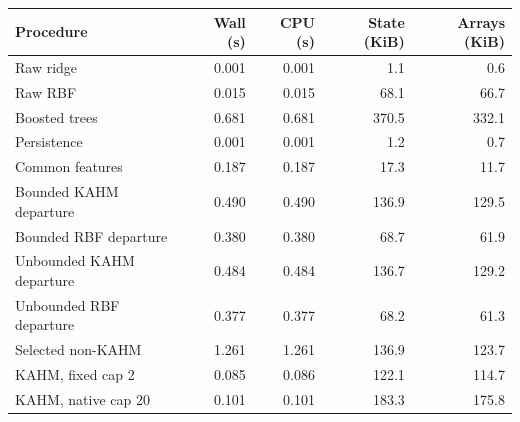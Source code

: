 \begin{tabular}{@{}lrrrr@{}}
\toprule
Procedure & Wall (s) & CPU (s) & State (KiB) & Arrays (KiB) \\
\midrule
Raw ridge & 0.001 & 0.001 & 1.1 & 0.6 \\
Raw RBF & 0.015 & 0.015 & 68.1 & 66.7 \\
Boosted trees & 0.681 & 0.681 & 370.5 & 332.1 \\
Persistence & 0.001 & 0.001 & 1.2 & 0.7 \\
Common features & 0.187 & 0.187 & 17.3 & 11.7 \\
Bounded KAHM departure & 0.490 & 0.490 & 136.9 & 129.5 \\
Bounded RBF departure & 0.380 & 0.380 & 68.7 & 61.9 \\
Unbounded KAHM departure & 0.484 & 0.484 & 136.7 & 129.2 \\
Unbounded RBF departure & 0.377 & 0.377 & 68.2 & 61.3 \\
Selected non-KAHM & 1.261 & 1.261 & 136.9 & 123.7 \\
KAHM, fixed cap 2 & 0.085 & 0.086 & 122.1 & 114.7 \\
KAHM, native cap 20 & 0.101 & 0.101 & 183.3 & 175.8 \\
\bottomrule
\end{tabular}
